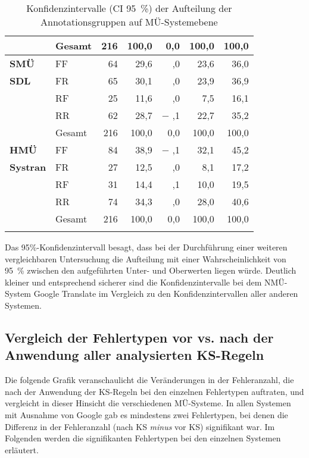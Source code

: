\begin{table}
\begin{tabularx}{\textwidth}{llrrrrr}
 &  Gesamt & 216 & 100,0 & 0,0 & 100,0 & 100,0\\
\midrule
{\textbf{SMÜ}} &  FF & 64 & 29,6 & ,0 & 23,6 & 36,0\\
\textbf{SDL} &  FR & 65 & 30,1 & ,0 & 23,9 & 36,9\\
 &  RF & 25 & 11,6 & ,0 & 7,5 & 16,1\\
 &  RR & 62 & 28,7 & $-$ ,1 & 22,7 & 35,2\\
 &  Gesamt & 216 & 100,0 & 0,0 & 100,0 & 100,0\\
\midrule
{\textbf{HMÜ}} &  FF & 84 & 38,9 & $-$ ,1 & 32,1 & 45,2\\
\textbf{Systran} &  FR & 27 & 12,5 & ,0 & 8,1 & 17,2\\
 &  RF & 31 & 14,4 & ,1 & 10,0 & 19,5\\
 &  RR & 74 & 34,3 & ,0 & 28,0 & 40,6\\
 &  Gesamt & 216 & 100,0 & 0,0 & 100,0 & 100,0\\
\lspbottomrule
\end{tabularx}
\caption{\label{tab:05:91}Konfidenzintervalle (CI 95~\%) der Aufteilung der Annotationsgruppen auf MÜ-Systemebene   }
\end{table}

Das 95\%-Konfidenzintervall besagt, dass bei der Durchführung einer weiteren vergleichbaren Untersuchung die Aufteilung mit einer Wahrscheinlichkeit von 95~\% zwischen den aufgeführten Unter- und Oberwerten liegen würde. Deutlich kleiner und entsprechend sicherer sind die Konfidenzintervalle bei dem NMÜ-System Google Translate im Vergleich zu den Konfidenzintervallen aller anderen Systemen.

\subsection{Vergleich der Fehlertypen vor vs. nach der Anwendung aller analysierten KS-Regeln}
\label{sec:5.4.4}

Die folgende Grafik veranschaulicht die Veränderungen in der Fehleranzahl, die nach der Anwendung der KS-Regeln bei den einzelnen Fehlertypen auftraten, und vergleicht in dieser Hinsicht die verschiedenen MÜ-Systeme. In allen Systemen mit Ausnahme von Google gab es mindestens zwei Fehlertypen, bei denen die Differenz in der Fehleranzahl (nach KS \textit{minus} vor KS) signifikant war. Im Folgenden werden die signifikanten Fehlertypen bei den einzelnen Systemen erläutert.


